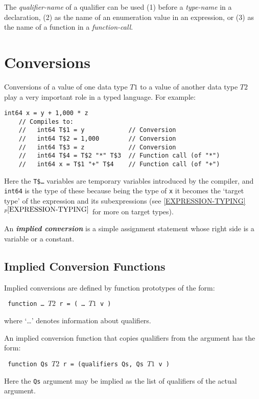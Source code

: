 \documentclass[12pt]{article}
\newcommand{\key}[1]{{\bf \em #1}\index{#1}}
\newcommand{\itemref}[1]{\ref{#1}$^{p\pageref{#1}}$}
\newenvironment{indpar}[1][0.3in]%
	{\begin{list}{}%
		     {\setlength{\itemsep}{0in}%
		      \setlength{\topsep}{0in}%
		      \setlength{\parsep}{1ex}%
		      \setlength{\labelwidth}{#1}%
		      \setlength{\leftmargin}{#1}%
		      \addtolength{\leftmargin}{\labelsep}}%
	 \item}%
	{\end{list}}
\begin{document}
The {\em qualifier-name} of a qualifier
can be used (1) before a {\em type-name}
in a declaration, (2) as the name of an enumeration value in an
expression, or (3) as the name of a function in a {\em function-call}.


\section{Conversions}
\label{CONVERSIONS}

Conversions of a value of one data type $T1$ to a value of another
data type $T2$ play a very important role in a typed language.
For example:
\begin{indpar}\begin{verbatim}
int64 x = y + 1,000 * z
    // Compiles to:
    //   int64 T$1 = y            // Conversion
    //   int64 T$2 = 1,000        // Conversion
    //   int64 T$3 = z            // Conversion
    //   int64 T$4 = T$2 "*" T$3  // Function call (of "*")
    //   int64 x = T$1 "+" T$4    // Function call (of "+")
\end{verbatim}\end{indpar}

Here the {\tt T\$\ldots} variables are temporary variables
introduced by the compiler, and {\tt int64} is the type
of these because being the type of {\tt x} it becomes the
`target type' of the expression and its subexpressions
(see \itemref{EXPRESSION-TYPING} for more on target types).

An \key{implied conversion} is a simple assignment statement whose
right side is a variable or a constant.

\subsection{Implied Conversion Functions}
\label{IMPLIED-CONVERSION-FUNCTIONS}

Implied conversions are defined by function prototypes of the form:
\begin{center} \tt
function \ldots{}~$T2$ r = ( \ldots{}~$T1$ v )
\end{center}
where `\ldots{}' denotes information about qualifiers.

An implied conversion function that copies qualifiers from the
argument has the form:
\begin{center} \tt
function Qs $T2$ r = (qualifiers Qs, Qs $T1$ v )
\end{center}

Here the {\tt Qs} argument may be implied as the list of
qualifiers of the actual argument.
\end{document}
